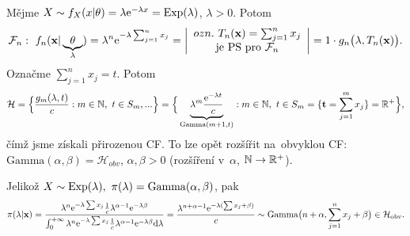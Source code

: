\begin{example}
	Mějme $X\sim f_X(x|\theta)=\lambda\mathrm{e}^{-\lambda x}=\mathrm{Exp}(\lambda)$, $\lambda>0$. Potom $$\mathcal{F}_n: ~f_n(\textbf{x}|\underbrace{\theta}_{\lambda})=\lambda^n\mathrm{e}^{-\lambda\sum_{j=1}^n x_j}=\left|\begin{array}{c}
	ozn.~T_n(\textbf{x})=\sum_{j=1}^n x_j\\\text{je PS pro~}\mathcal{F}_n
\end{array}
\right|=1\cdot g_n\big(\lambda,T_n(\textbf{x})\big).$$
Označme $\sum_{j=1}^n x_j=t$. Potom $$\mathcal{H}=\Big\{ \frac{g_m(\lambda,t)}{c}:m\in\mathbb{N},~t\in S_m,... \Big\}=\Big\{\underbrace{\lambda^m\frac{\mathrm{e}^{-\lambda t}}{c}}_{\mathrm{Gamma}(m+1,t)}:m\in\mathbb{N},~t\in S_m=\{\textbf{t}=\sum_{j=1}^m x_j \}=\mathbb{R}^+\Big\},$$
čímž jsme získali přirozenou CF.
To lze opět rozšířit na~obvyklou CF:  $\mathrm{Gamma} (\alpha,\beta)=\mathcal{H}_{obv}$, $\alpha,\beta >0$ (rozšíření v~$\alpha$, $\mathbb{N}\rightarrow \mathbb{R}^{+}$).

Jelikož $X\sim\mathrm{Exp}(\lambda),~\pi(\lambda)=\mathrm{Gamma}(\alpha,\beta)$, pak 
$$ \pi(\lambda|\textbf{x})=\frac{\lambda^n\mathrm{e}^{-\lambda\sum x_j}\frac{1}{c}\lambda^{\alpha-1}\mathrm{e}^{-\lambda\beta}}{\int_{0}^{+\infty}\lambda^n\mathrm{e}^{-\lambda\sum x_j}\frac{1}{c}\lambda^{\alpha-1}\mathrm{e}^{-\lambda\beta}\mathrm{d}\lambda}=\frac{\lambda^{n+\alpha-1}\mathrm{e}^{-\lambda(\sum x_j+\beta)}}{c}\sim\mathrm{Gamma}\big(n+\alpha,\sum\limits_{j=1}^{n} x_j+\beta\big)\in\mathcal{H}_\text{obv} .$$

\end{example}
